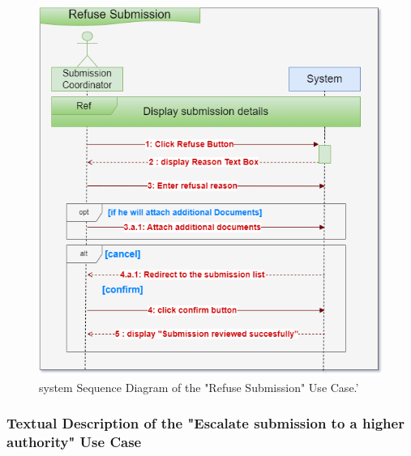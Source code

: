 \clearpage
\begin{figure}[h!]
    \centering
    \includegraphics[width=1\textwidth]{figures/seqrefuse_submission.png}
    \caption{system Sequence Diagram of the "Refuse Submission" Use Case.'}
\end{figure}
\clearpage


\subsubsection{Textual Description of the "Escalate submission to a higher authority" Use Case}

